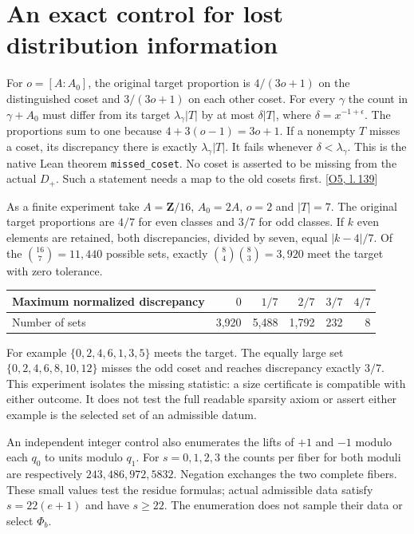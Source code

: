 \documentclass[12pt,letterpaper]{article}
\newcommand{\id}[1]{{\small\nolinkurl{#1}}}
\begin{document}
\section{An exact control for lost distribution information}
For $o=[A:A_0]$, the original target proportion is $4/(3o+1)$ on the distinguished coset and $3/(3o+1)$ on each other coset. For every $\gamma$ the count in $\gamma+A_0$ must differ from its target $\lambda_\gamma |T|$ by at most $\delta |T|$, where $\delta=x^{-1+\epsilon}$. The proportions sum to one because $4+3(o-1)=3o+1$. If a nonempty $T$ misses a coset, its discrepancy there is exactly $\lambda_\gamma |T|$. It fails whenever $\delta<\lambda_\gamma$. This is the native Lean theorem \id{missed_coset}. No coset is asserted to be missing from the actual $D_+$. Such a statement needs a map to the old cosets first. {\footnotesize\sffamily\color{mute}[\href{https://github.com/nousentllc/riemann-hypothesis/blob/40e56bab026552e089d7afcfeff08d2defb9c005/src/Formalism/SharpRestriction/RamificationFrobenius/TotientGaloisClasses/ExplicitFormulaErrorOfHostConditions.lean#L139}{O5, l.\,139}]}

As a finite experiment take $A=\mathbf Z/16$, $A_0=2A$, $o=2$ and $|T|=7$. The original target proportions are $4/7$ for even classes and $3/7$ for odd classes. If $k$ even elements are retained, both discrepancies, divided by seven, equal $|k-4|/7$. Of the $\binom{16}7=11{,}440$ possible sets, exactly $\binom84\binom83=3{,}920$ meet the target with zero tolerance.
\begin{center}\small
\begin{tabular}{@{}lrrrrr@{}}\toprule
Maximum normalized discrepancy & $0$ & $1/7$ & $2/7$ & $3/7$ & $4/7$\\\midrule
Number of sets & 3,920 & 5,488 & 1,792 & 232 & 8\\\bottomrule
\end{tabular}\end{center}
For example $\{0,2,4,6,1,3,5\}$ meets the target. The equally large set $\{0,2,4,6,8,10,12\}$ misses the odd coset and reaches discrepancy exactly $3/7$. This experiment isolates the missing statistic: a size certificate is compatible with either outcome. It does not test the full readable sparsity axiom or assert either example is the selected set of an admissible datum.

An independent integer control also enumerates the lifts of $+1$ and $-1$ modulo each $q_0$ to units modulo $q_1$. For $s=0,1,2,3$ the counts per fiber for both moduli are respectively $243,486,972,5832$. Negation exchanges the two complete fibers. These small values test the residue formulas; actual admissible data satisfy $s=22(e+1)$ and have $s\ge22$. The enumeration does not sample their data or select $\Phi_b$.
\end{document}
